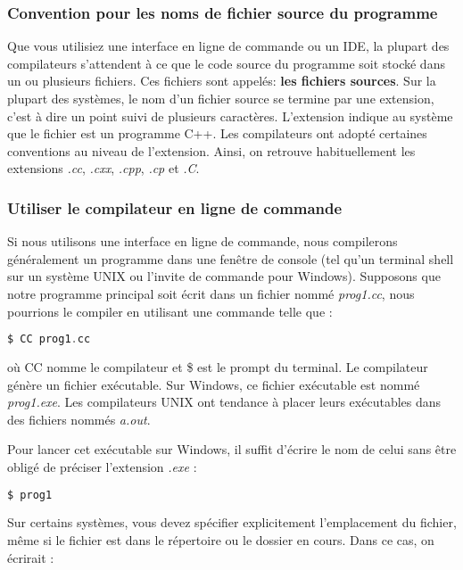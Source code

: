 \subsubsection{Convention pour les noms de fichier source du programme}

Que vous utilisiez une interface en ligne de commande ou un IDE, la plupart des compilateurs s'attendent à ce que le code source du programme soit stocké dans un ou plusieurs fichiers. Ces fichiers sont appelés: \textbf{les fichiers sources}. Sur la plupart des systèmes, le nom d'un fichier source se termine par une extension, c'est à dire un point suivi de plusieurs caractères. L'extension indique au système que le fichier est un programme C++. Les compilateurs ont adopté certaines conventions au niveau de l'extension. Ainsi, on retrouve habituellement les extensions \textit{.cc}, \textit{.cxx}, \textit{.cpp}, \textit{.cp} et \textit{.C}.

\subsubsection{Utiliser le compilateur en ligne de commande}

Si nous utilisons une interface en ligne de commande, nous compilerons généralement un programme dans une fenêtre de console (tel qu'un terminal shell sur un système UNIX ou l'invite de commande pour Windows). Supposons que notre programme principal soit écrit dans un fichier nommé \textit{prog1.cc}, nous pourrions le compiler en utilisant une commande telle que :

\medbreak
\begin{lstlisting}[language=C]
	$ CC prog1.cc
\end{lstlisting}
\medbreak

où CC nomme le compilateur et \$ est le prompt du terminal. Le compilateur génère un fichier exécutable. Sur Windows, ce fichier exécutable est nommé \textit{prog1.exe}. Les compilateurs UNIX ont tendance à placer leurs exécutables dans des fichiers nommés \textit{a.out}.

Pour lancer cet exécutable sur Windows, il suffit d'écrire le nom de celui sans être obligé de préciser l'extension \textit{.exe} :

\medbreak
\begin{lstlisting}[language=C]
	$ prog1
\end{lstlisting}
\medbreak

Sur certains systèmes, vous devez spécifier explicitement l'emplacement du fichier, même si le fichier est dans le répertoire ou le dossier en cours. Dans ce cas, on écrirait :

